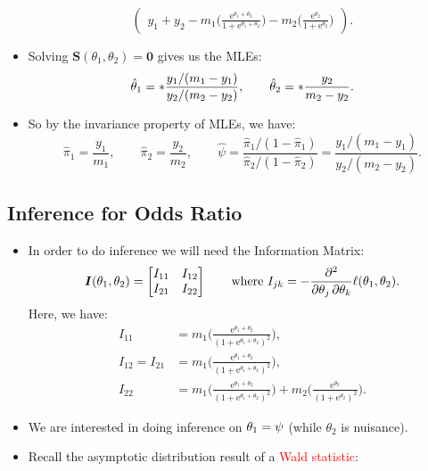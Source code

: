 \documentclass{article}\usepackage[]{graphicx}\usepackage[svgnames]{xcolor}
\let\log\relax%
\providecommand{\Vector}[1]{\bm{#1}}%
\providecommand{\Matrix}[1]{\bm{#1}}
\begin{document}
\begin{itemize}
\[\begin{pmatrix}
                  y_1+y_2-m_1\biggl(\frac{\mathrm{e}^{\theta_1+\theta_2}}{1+\mathrm{e}^{\theta_1+\theta_2}} \biggr)-m_2\biggl(\frac{\mathrm{e}^{\theta_2}}{1+\mathrm{e}^{\theta_2}} \biggr)
              \end{pmatrix}. \]
    \item Solving $ \Vector{S}(\theta_1,\theta_2)=\Vector{0} $ gives us the MLEs:
          \[ \hat{\theta}_1=\log*{\frac{y_1/(m_1-y_1)}{y_2/(m_2-y_2)}},\qquad \hat{\theta}_2=\log*{\frac{y_2}{m_2-y_2}}. \]
    \item So by the invariance property of MLEs, we have:
          \[ \hat{\pi}_1=\frac{y_1}{m_1},\qquad \hat{\pi}_2=\frac{y_2}{m_2},\qquad\hat{\psi}=\frac{\hat{\pi}_1/(1-\hat{\pi}_1)}{\hat{\pi}_2/(1-\hat{\pi}_2)}=\frac{y_1/(m_1-y_1)}{y_2/(m_2-y_2)}.  \]
\end{itemize}
\subsection*{Inference for Odds Ratio}
\begin{itemize}
    \item In order to do inference we will need the Information Matrix:
          \[ \Matrix{I}(\theta_1,\theta_2)=\begin{bmatrix}
                  I_{11} & I_{12} \\
                  I_{21} & I_{22}
              \end{bmatrix}\qquad\text{where }I_{jk}=-\pdv*{\ell(\theta_1,\theta_2)}{\theta_j,\theta_k}. \]
          Here, we have:
          \begin{align*}
              I_{11}          & =m_1\biggl(\frac{\mathrm{e}^{\theta_1+\theta_2}}{(1+\mathrm{e}^{\theta_1+\theta_2})^2} \biggr),                                                                             \\
              I_{12}  =I_{21} & =m_1\biggl(\frac{\mathrm{e}^{\theta_1+\theta_2}}{(1+\mathrm{e}^{\theta_1+\theta_2})^2} \biggr),                                                                             \\
              I_{22}          & =m_1\biggl(\frac{\mathrm{e}^{\theta_1+\theta_2}}{(1+\mathrm{e}^{\theta_1+\theta_2})^2} \biggr)+m_2\biggl(\frac{\mathrm{e}^{\theta_2}}{(1+\mathrm{e}^{\theta_2})^2} \biggr).
          \end{align*}
    \item We are interested in doing inference on $ \theta_1=\log{\psi} $ (while $ \theta_2 $ is nuisance).
    \item Recall the asymptotic distribution result of a \textcolor{Red}{Wald statistic}:
\end{itemize}
\end{document}
